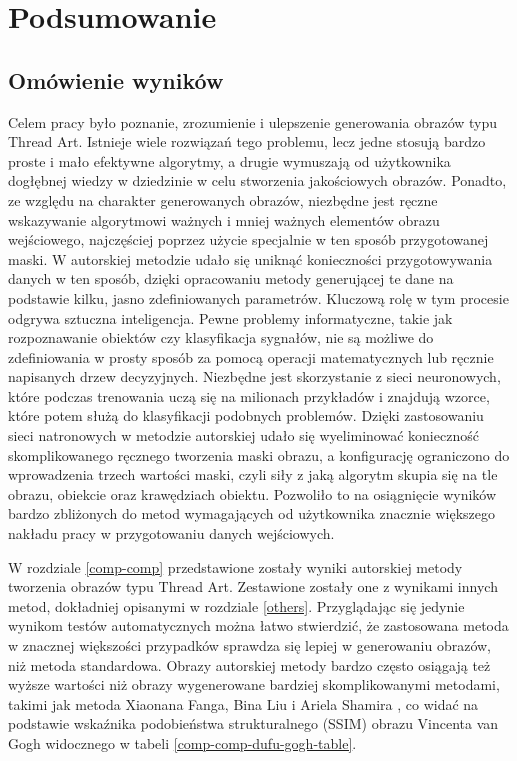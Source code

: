     
\chapter{Podsumowanie}
    \section{Omówienie wyników}
    Celem pracy było poznanie, zrozumienie i ulepszenie generowania obrazów typu Thread Art. Istnieje wiele rozwiązań tego problemu, lecz jedne stosują bardzo proste i mało efektywne algorytmy, a drugie wymuszają od użytkownika dogłębnej wiedzy w dziedzinie w celu stworzenia jakościowych obrazów. Ponadto, ze względu na charakter generowanych obrazów, niezbędne jest ręczne wskazywanie algorytmowi ważnych i mniej ważnych elementów obrazu wejściowego, najczęściej poprzez użycie specjalnie w ten sposób przygotowanej maski. W autorskiej metodzie udało się uniknąć konieczności przygotowywania danych w ten sposób, dzięki opracowaniu metody generującej te dane na podstawie kilku, jasno zdefiniowanych parametrów. Kluczową rolę w tym procesie odgrywa sztuczna inteligencja. Pewne problemy informatyczne, takie jak rozpoznawanie obiektów czy klasyfikacja sygnałów, nie są możliwe do zdefiniowania w prosty sposób za pomocą operacji matematycznych lub ręcznie napisanych drzew decyzyjnych. Niezbędne jest skorzystanie z sieci neuronowych, które podczas trenowania uczą się na milionach przykładów i znajdują wzorce, które potem służą do klasyfikacji podobnych problemów. Dzięki zastosowaniu sieci natronowych w metodzie autorskiej udało się wyeliminować konieczność skomplikowanego ręcznego tworzenia maski obrazu, a konfigurację ograniczono do wprowadzenia trzech wartości maski, czyli siły z jaką algorytm skupia się na tle obrazu, obiekcie oraz krawędziach obiektu. Pozwoliło to na osiągnięcie wyników bardzo zbliżonych do metod wymagających od użytkownika znacznie większego nakładu pracy w przygotowaniu danych wejściowych.
    
    W rozdziale \ref{comp-comp} przedstawione zostały wyniki autorskiej metody tworzenia obrazów typu Thread Art. Zestawione zostały one z wynikami innych metod, dokładniej opisanymi w rozdziale \ref{others}. Przyglądając się jedynie wynikom testów automatycznych można łatwo stwierdzić, że zastosowana metoda w znacznej większości przypadków sprawdza się lepiej w generowaniu obrazów, niż metoda standardowa. Obrazy autorskiej metody bardzo często osiągają też wyższe wartości niż obrazy wygenerowane bardziej skomplikowanymi metodami, takimi jak metoda Xiaonana Fanga, Bina Liu i Ariela Shamira \cite{article-string-art-xiaonan}, co widać na podstawie wskaźnika podobieństwa strukturalnego (SSIM) obrazu Vincenta van Gogh widocznego w tabeli \ref{comp-comp-dufu-gogh-table}. 
    

